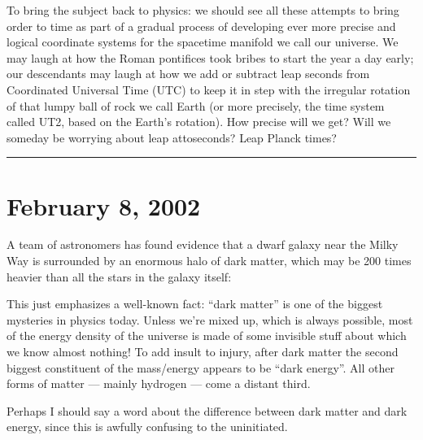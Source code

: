 \documentclass{article}
\def\tightlist{}
\renewcommand{\texttt}[1]{%
  \begingroup
  \ttfamily
  \begingroup\lccode`~=`/\lowercase{\endgroup\def~}{/\discretionary{}{}{}}%
  \begingroup\lccode`~=`[\lowercase{\endgroup\def~}{[\discretionary{}{}{}}%
  \begingroup\lccode`~=`.\lowercase{\endgroup\def~}{.\discretionary{}{}{}}%
  \catcode`/=\active\catcode`[=\active\catcode`.=\active
  \scantokens{#1\noexpand}%
  \endgroup
}
\begin{document}
To bring the subject back to physics: we should see all these attempts
to bring order to time as part of a gradual process of developing ever
more precise and logical coordinate systems for the spacetime manifold
we call our universe. We may laugh at how the Roman pontifices took
bribes to start the year a day early; our descendants may laugh at how
we add or subtract leap seconds from Coordinated Universal Time (UTC) to
keep it in step with the irregular rotation of that lumpy ball of rock
we call Earth (or more precisely, the time system called UT2, based on
the Earth's rotation). How precise will we get? Will we someday be
worrying about leap attoseconds? Leap Planck times?

\begin{center}\rule{0.5\linewidth}{0.5pt}\end{center}



\hypertarget{week176}{%
\section{February 8, 2002}\label{week176}}

A team of astronomers has found evidence that a dwarf galaxy near the
Milky Way is surrounded by an enormous halo of dark matter, which may be
200 times heavier than all the stars in the galaxy itself:


This just emphasizes a well-known fact: ``dark matter'' is one of the
biggest mysteries in physics today. Unless we're mixed up, which is
always possible, most of the energy density of the universe is made of
some invisible stuff about which we know almost nothing! To add insult
to injury, after dark matter the second biggest constituent of the
mass/energy appears to be ``dark energy''. All other forms of matter ---
mainly hydrogen --- come a distant third.

Perhaps I should say a word about the difference between dark matter and
dark energy, since this is awfully confusing to the uninitiated.
\end{document}
